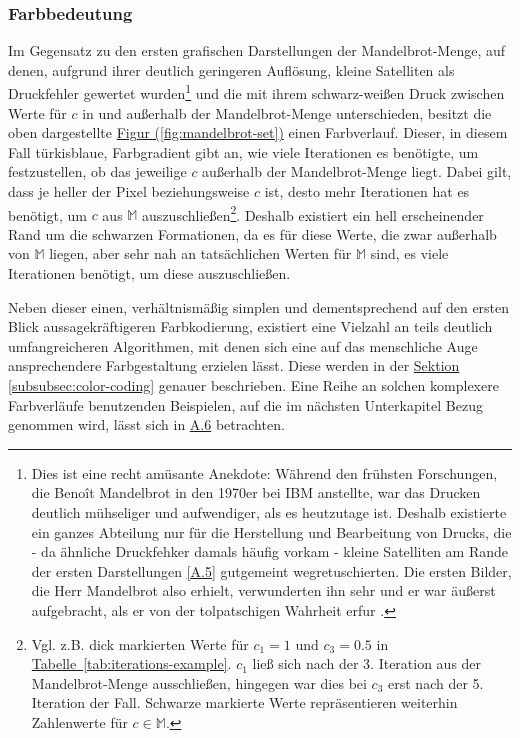 \subsubsection{Farbbedeutung}\label{subsubsec:color-meaning}

Im Gegensatz zu den ersten grafischen Darstellungen der Mandelbrot-Menge,
auf denen, aufgrund ihrer deutlich geringeren Auflösung,
kleine Satelliten als Druckfehler gewertet wurden\footnote{
  Dies ist eine recht amüsante Anekdote: Während den frühsten Forschungen,
  die Benoît Mandelbrot in den 1970er bei IBM anstellte, war das Drucken deutlich
  mühseliger und aufwendiger, als es heutzutage ist.
  Deshalb existierte ein ganzes Abteilung nur für die Herstellung und Bearbeitung von
  Drucks, die - da ähnliche Druckfehker damals häufig vorkam - kleine Satelliten
  am Rande der ersten Darstellungen \hyperref[app:5]{[A.5]} gutgemeint wegretuschierten.
  Die ersten Bilder, die Herr Mandelbrot also erhielt, verwunderten ihn sehr und
  er war äußerst aufgebracht, als er von der tolpatschigen Wahrheit erfur
  \cite{numberphile_whats_2019}.
}
und die mit ihrem schwarz-weißen Druck zwischen Werte für $c$ in
und außerhalb der Mandelbrot-Menge unterschieden,
besitzt die oben dargestellte
\hyperref[fig:mandelbrot-set]{Figur (\ref{fig:mandelbrot-set})}
einen Farbverlauf.
Dieser, in diesem Fall türkisblaue, Farbgradient gibt an,
wie viele Iterationen es benötigte,
um festzustellen, ob das jeweilige $c$ außerhalb der Mandelbrot-Menge liegt.
Dabei gilt, dass je heller der Pixel beziehungsweise $c$ ist, desto mehr
Iterationen hat es benötigt, um $c$ aus $\mathbb{M}$ auszuschließen\footnote{
  Vgl. z.B. dick markierten Werte für $c_1 = 1 \text{ und } c_3 = 0.5$ in
  \hyperref[tab:iterations-example]{Tabelle~\ref{tab:iterations-example}}.
  $c_1$ ließ sich nach der 3. Iteration aus der Mandelbrot-Menge ausschließen,
  hingegen war dies bei $c_3$ erst nach der 5. Iteration der Fall.
  Schwarze markierte Werte repräsentieren weiterhin Zahlenwerte
  für $c \in \mathbb{M}$.
}.
Deshalb existiert ein hell erscheinender Rand um die schwarzen Formationen,
da es für diese Werte, die zwar außerhalb von $\mathbb{M}$ liegen, aber sehr nah
an tatsächlichen Werten für $\mathbb{M}$ sind,
es viele Iterationen benötigt, um diese auszuschließen.

Neben dieser einen, verhältnismäßig simplen und dementsprechend auf den ersten
Blick aussagekräftigeren Farbkodierung, existiert eine Vielzahl an teils deutlich
umfangreicheren Algorithmen, mit denen sich eine auf das menschliche Auge
ansprechendere Farbgestaltung erzielen lässt.
Diese werden in der \hyperref[subsubsec:color-coding]{Sektion \ref{subsubsec:color-coding}}
genauer beschrieben.
Eine Reihe an solchen komplexere Farbverläufe benutzenden Beispielen,
auf die im nächsten Unterkapitel Bezug genommen wird,
lässt sich in \hyperref[app:6]{A.6} betrachten.

